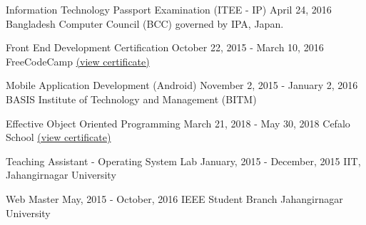 \cvcertificate
{Information Technology Passport Examination (ITEE - IP)}
{April 24, 2016}
{Bangladesh Computer Council (BCC) governed by IPA, Japan.}
\divider

\cvcertificate
{Front End Development Certification}
{October 22, 2015 - March 10, 2016}
{FreeCodeCamp \href{https://www.freecodecamp.org/certification/arsho/legacy-front-end}{(view certificate)}}
\divider

\cvcertificate
{Mobile Application Development (Android)}
{November 2, 2015 - January 2, 2016}
{BASIS Institute of Technology and Management (BITM)}

\divider

\cvcertificate
{Effective Object Oriented Programming}
{March 21, 2018 - May 30, 2018}
{Cefalo School \href{https://school.cefalolab.com/20181104.pdf}{(view certificate)}}

\medskip

\cvcertificate
{Teaching Assistant - Operating System Lab}
{January, 2015 - December, 2015}
{IIT, Jahangirnagar University}
\divider

\cvcertificate
{Web Master}
{May, 2015 - October, 2016}
{IEEE Student Branch Jahangirnagar University}

\medskip


